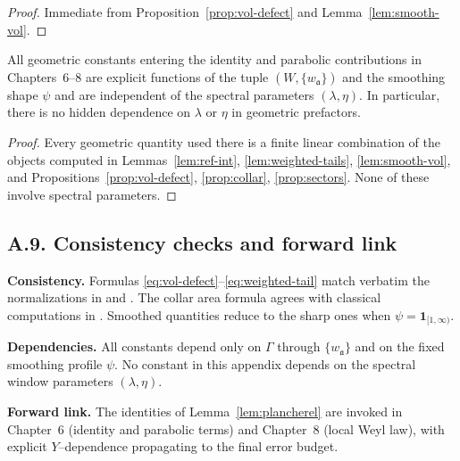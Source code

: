 \begin{proof}
Immediate from Proposition~\ref{prop:vol-defect} and Lemma~\ref{lem:smooth-vol}.
\end{proof}

\begin{proposition}\label{prop:uniform-geom}
All geometric constants entering the identity and parabolic contributions in
Chapters~6–8 are explicit functions of the tuple
$(W,\{w_{\mathfrak a}\})$ and the smoothing shape $\psi$ and are independent of
the spectral parameters $(\lambda,\eta)$. In particular, there is no hidden
dependence on $\lambda$ or $\eta$ in geometric prefactors.
\end{proposition}

\begin{proof}
Every geometric quantity used there is a finite linear combination of the
objects computed in Lemmas~\ref{lem:ref-int}, \ref{lem:weighted-tails},
\ref{lem:smooth-vol}, and Propositions~\ref{prop:vol-defect}, \ref{prop:collar},
\ref{prop:sectors}. None of these involve spectral parameters.
\end{proof}


\subsection*{A.9. Consistency checks and forward link}

\noindent
\textbf{Consistency.}
Formulas \eqref{eq:vol-defect}–\eqref{eq:weighted-tail} match verbatim the
normalizations in \cite[§2–§3]{Hejhal1983} and \cite[Chap.~3]{Iwaniec2002}.
The collar area formula agrees with classical computations in
\cite[§4.1]{Buser1992}. Smoothed quantities reduce to the sharp ones when
$\psi=\mathbf 1_{[1,\infty)}$.

\medskip
\noindent
\textbf{Dependencies.}
All constants depend only on $\Gamma$ through $\{w_{\mathfrak a}\}$ and on the
fixed smoothing profile $\psi$. No constant in this appendix depends on the
spectral window parameters $(\lambda,\eta)$.

\medskip
\noindent
\textbf{Forward link.}
The identities of Lemma~\ref{lem:plancherel} are invoked in Chapter~6 (identity
and parabolic terms) and Chapter~8 (local Weyl law), with explicit $Y$–dependence
propagating to the final error budget.

